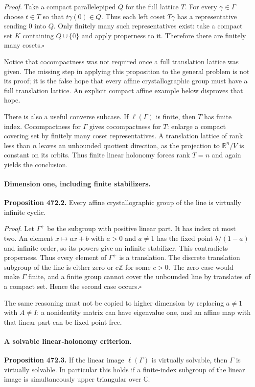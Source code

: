 \documentclass[11pt]{article}
\begin{document}
\emph{Proof.}
Take a compact parallelepiped $Q$ for the full lattice $T$. For every
$\gamma\in\Gamma$ choose $t\in T$ so that $t\gamma(0)\in Q$.
Thus each left coset $T\gamma$ has a representative sending $0$ into
$Q$. Only finitely many such representatives exist: take a compact
set $K$ containing $Q\cup\{0\}$ and apply properness to it.
Therefore there are finitely many cosets.\hfill$\square$

Notice that cocompactness was not required once a full translation
lattice was given. The missing step in applying this proposition to
the general problem is not its proof; it is the false hope that every
affine crystallographic group must have a full translation lattice.
An explicit compact affine example below disproves that hope.

There is also a useful converse subcase. If $\ell(\Gamma)$ is finite,
then $T$ has finite index. Cocompactness for $\Gamma$ gives cocompactness
for $T$: enlarge a compact covering set by finitely many coset
representatives. A translation lattice of rank less than $n$ leaves
an unbounded quotient direction, as the projection to $\mathbb R^n/V$
is constant on its orbits. Thus finite linear holonomy forces
rank $T=n$ and again yields the conclusion.

\paragraph{Dimension one, including finite stabilizers.}
\textbf{Proposition 472.2.} Every affine crystallographic group of the
line is virtually infinite cyclic.

\emph{Proof.}
Let $\Gamma^+$ be the subgroup with positive linear part. It has index
at most two. An element $x\mapsto ax+b$ with $a>0$ and $a\ne1$ has
the fixed point $b/(1-a)$ and infinite order, so its powers give an
infinite stabilizer. This contradicts properness. Thus every element
of $\Gamma^+$ is a translation. The discrete translation subgroup of
the line is either zero or $c\mathbb Z$ for some $c>0$. The zero
case would make $\Gamma$ finite, and a finite group cannot cover the
unbounded line by translates of a compact set. Hence the second case
occurs.\hfill$\square$

The same reasoning must not be copied to higher dimension by replacing
$a\ne1$ with $A\ne I$: a nonidentity matrix can have eigenvalue one,
and an affine map with that linear part can be fixed-point-free.

\paragraph{A solvable linear-holonomy criterion.}
\textbf{Proposition 472.3.} If the linear image $\ell(\Gamma)$ is
virtually solvable, then $\Gamma$ is virtually solvable. In particular
this holds if a finite-index subgroup of the linear image is
simultaneously upper triangular over $\mathbb C$.
\end{document}
